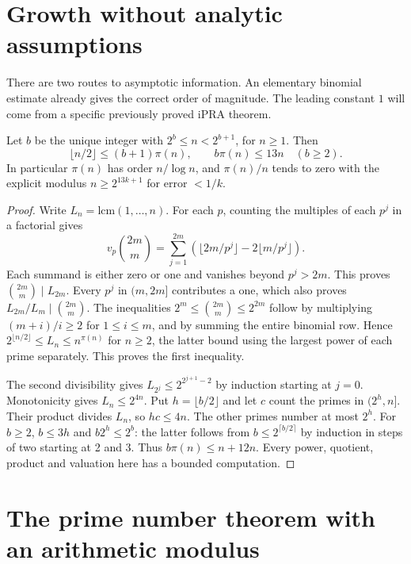 \section{Growth without analytic assumptions}
\label{sec:dyadicgrowth}

There are two routes to asymptotic information. An elementary binomial estimate already gives the correct order of magnitude. The leading constant $1$ will come from a specific previously proved iPRA theorem.

\begin{proposition}
Let $b$ be the unique integer with $2^b\le n<2^{b+1}$, for $n\ge1$. Then
\[
 \lfloor n/2\rfloor\le (b+1)\pi(n),\qquad
 b\pi(n)\le13n\quad(b\ge2).
\]
In particular $\pi(n)$ has order $n/\log n$, and $\pi(n)/n$ tends to zero with the explicit modulus $n\ge2^{13k+1}$ for error $<1/k$.
\end{proposition}
\begin{proof}
Write $L_n=\mathrm{lcm}(1,\ldots,n)$. For each $p$, counting the multiples of each $p^j$ in a factorial gives
\[
 v_p\binom{2m}{m}
 =\sum_{j=1}^{2m}\left(\lfloor2m/p^j\rfloor-2\lfloor m/p^j\rfloor\right).
\]
Each summand is either zero or one and vanishes beyond $p^j>2m$. This proves $\binom{2m}{m}\mid L_{2m}$. Every $p^j$ in $(m,2m]$ contributes a one, which also proves $L_{2m}/L_m\mid\binom{2m}{m}$. The inequalities
$2^m\le\binom{2m}{m}\le2^{2m}$ follow by multiplying $(m+i)/i\ge2$ for $1\le i\le m$, and by summing the entire binomial row. Hence $2^{\lfloor n/2\rfloor}\le L_n\le n^{\pi(n)}$ for $n\ge2$, the latter bound using the largest power of each prime separately. This proves the first inequality.

The second divisibility gives $L_{2^j}\le2^{2^{j+1}-2}$ by induction starting at $j=0$. Monotonicity gives $L_n\le2^{4n}$. Put $h=\lfloor b/2\rfloor$ and let $c$ count the primes in $(2^h,n]$. Their product divides $L_n$, so $hc\le4n$. The other primes number at most $2^h$. For $b\ge2$, $b\le3h$ and $b2^h\le2^b$: the latter follows from $b\le2^{\lceil b/2\rceil}$ by induction in steps of two starting at 2 and 3. Thus $b\pi(n)\le n+12n$. Every power, quotient, product and valuation here has a bounded computation.
\end{proof}

\section{The prime number theorem with an arithmetic modulus}
\label{sec:pntgrowth}

